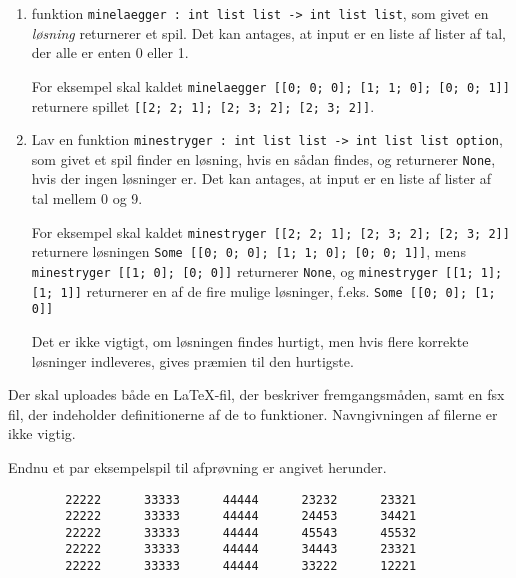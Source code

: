 \documentclass[a4paper]{article}
\begin{document}
\begin{enumerate}[Nød {1}.1]

\item funktion \texttt{minelaegger : int list list -> int list list},
  som givet en \emph{løsning} returnerer et spil.  Det kan antages, at
  input er en liste af lister af tal, der alle er enten 0 eller 1.

For eksempel skal kaldet
\texttt{minelaegger [[0; 0; 0]; [1; 1; 0]; [0; 0; 1]]}
returnere spillet \texttt{[[2; 2; 1]; [2; 3; 2]; [2; 3; 2]]}.


\item Lav en funktion \texttt{minestryger : int list list -> int list list
  option}, som givet et spil finder en løsning, hvis en sådan findes,
og returnerer \texttt{None}, hvis der ingen løsninger er.  Det kan antages, at input er en liste af lister af tal mellem 0 og 9.

For eksempel skal kaldet
\texttt{minestryger [[2; 2; 1]; [2; 3; 2]; [2; 3; 2]]}
returnere løsningen
\texttt{Some [[0; 0; 0]; [1; 1; 0]; [0; 0; 1]]},
mens 
\texttt{minestryger [[1; 0]; [0; 0]]}
returnerer \texttt{None}, og
\texttt{minestryger [[1; 1]; [1; 1]]}
returnerer en af de fire mulige løsninger, f.eks.
\texttt{Some [[0; 0]; [1; 0]]}


Det er ikke vigtigt, om løsningen findes hurtigt, men hvis flere
korrekte løsninger indleveres, gives præmien til den hurtigste.

\end{enumerate}

\noindent
Der skal uploades både en \LaTeX-fil, der beskriver fremgangsmåden,
samt en fsx fil, der indeholder definitionerne af de to funktioner.
Navngivningen af filerne er ikke vigtig.

Endnu et par eksempelspil til afprøvning er angivet herunder.

\begin{verbatim}
        22222      33333      44444      23232      23321
        22222      33333      44444      24453      34421
        22222      33333      44444      45543      45532
        22222      33333      44444      34443      23321
        22222      33333      44444      33222      12221
\end{verbatim}
\end{document}

